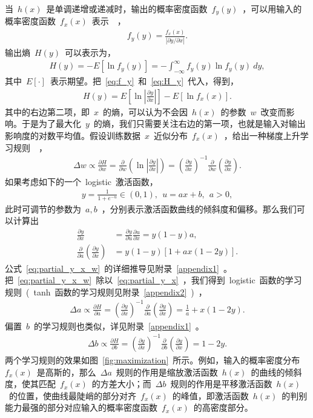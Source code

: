 \documentclass[UTF8,a4paper,12pt]{ctexart}
\numberwithin{equation}{section}
\numberwithin{figure}{section}
\numberwithin{table}{section}
\begin{document}
当~$h(x)$~是单调递增或递减时，输出的概率密度函数~$f_y(y)$~，可以用输入的概率密度函数~$f_x(x)$~表示~\cite{papoulis2002probability}~，
\begin{align}
f_y(y)=\frac{f_x(x)}{|\partial y / \partial x|}. \label{eq:f_y}
\end{align}
输出熵~$H(y)$~可以表示为，
\begin{align}
H(y)=-E[\ln f_y(y)]=-\int_{-\infty}^{\infty} f_y(y) \ln f_y(y)~dy, \label{eq:H_y}
\end{align}
其中~$E[\cdot]$~表示期望。把~\eqref{eq:f_y}~和~\eqref{eq:H_y}~代入，得到，
\begin{align}
H(y)=E\left[ \ln\left| \frac{\partial y}{\partial x} \right| \right] - E[\ln f_x(x)].
\end{align}
其中的右边第二项，即~$x$~的熵，可以认为不会因~$h(x)$~的参数~$w$~改变而影响。于是为了最大化~$y$~的熵，我们只需要关注右边的第一项，也就是输入对输出影响度的对数平均值。假设训练数据~$x$~近似分布~$f_x(x)$~，给出一种梯度上升学习规则~\cite{bell1995information}~，
\begin{align}
\Delta w \varpropto \frac{\partial H}{\partial w} = \frac{\partial }{\partial w} \left( \ln \left| \frac{\partial y}{\partial x} \right| \right) = \left( \frac{\partial y}{\partial x} \right)^{-1} \frac{\partial }{\partial w} \left( \frac{\partial y}{\partial x} \right).
\end{align}
如果考虑如下的一个~logistic~激活函数，
\begin{align}
y = \frac{1}{1 + e^{-u}} \in (0,1),~~u=ax + b,~~a>0,
\end{align}
此时可调节的参数为~$a,b$~，分别表示激活函数曲线的倾斜度和偏移。那么我们可以计算出
\begin{align}
\frac{\partial y}{\partial x} &= \frac{\partial y}{\partial u} \frac{\partial u}{\partial x} = y(1-y)a, \label{eq:partial_y_x} \\
\frac{\partial}{\partial a} \left( \frac{\partial y}{\partial x} \right) &= y(1-y)[1+ax(1-2y)]. \label{eq:partial_y_x_w}
\end{align}
公式~\eqref{eq:partial_y_x_w}~的详细推导见附录~\ref{appendix1}~。把~\eqref{eq:partial_y_x_w}~除以~\eqref{eq:partial_y_x}~，我们得到~logistic~函数的学习规则~(~tanh~函数的学习规则见附录~\ref{appendix2}~)~，
\begin{align}
\Delta a \varpropto \frac{\partial H}{\partial a} = \left( \frac{\partial y}{\partial x} \right)^{-1} \frac{\partial }{\partial a} \left( \frac{\partial y}{\partial x} \right) = \frac{1}{a} + x(1-2y).
\end{align}
偏置~$b$~的学习规则也类似，详见附录~\ref{appendix1}~。
\begin{align}
\Delta b \varpropto \frac{\partial H}{\partial b} = \left( \frac{\partial y}{\partial x} \right)^{-1} \frac{\partial }{\partial b} \left( \frac{\partial y}{\partial x} \right) = 1-2y.
\end{align}
两个学习规则的效果如图~\ref{fig:maximization}~所示。例如，输入的概率密度分布~$f_x(x)$~是高斯的，那么~$\Delta a$~规则的作用是缩放激活函数~$h(x)$~的曲线的倾斜度，使其匹配~$f_x(x)$~的方差大小；而~$\Delta b$~规则的作用是平移激活函数~$h(x)$~的位置，使曲线最陡峭的部分对齐~$f_x(x)$~的峰值，即激活函数~$h(x)$~的判别能力最强的部分对应输入的概率密度函数~$f_x(x)$~的高密度部分。
\end{document}
